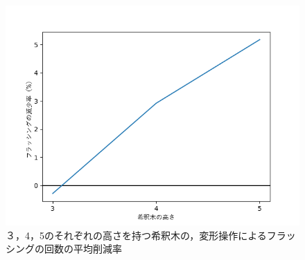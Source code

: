 \begin{figure}[tbp]
 \centering 
    \includegraphics[scale=1.0]{img/decreasement.png}
 \caption{３，4，5のそれぞれの高さを持つ希釈木の，変形操作によるフラッシングの回数の平均削減率}\label{fig:graph}
\end{figure}
